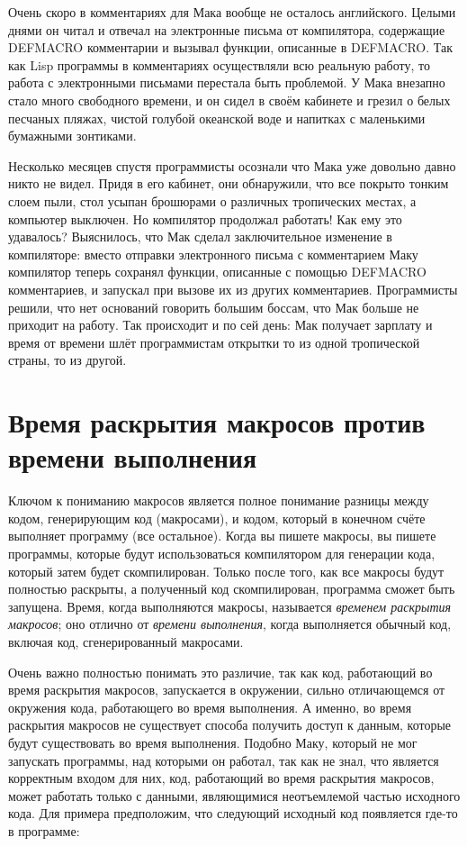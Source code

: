 Очень скоро в комментариях для Мака вообще не осталось английского. Целыми днями он читал
и отвечал на электронные письма от компилятора, содержащие DEFMACRO комментарии и вызывал
функции, описанные в DEFMACRO. Так как Lisp программы в комментариях осуществляли всю
реальную работу, то работа с электронными письмами перестала быть проблемой. У Мака
внезапно стало много свободного времени, и он сидел в своём кабинете и грезил о белых
песчаных пляжах, чистой голубой океанской воде и напитках с маленькими бумажными
зонтиками.

Несколько месяцев спустя программисты осознали что Мака уже довольно давно никто не
видел. Придя в его кабинет, они обнаружили, что все покрыто тонким слоем пыли, стол усыпан
брошюрами о различных тропических местах, а компьютер выключен. Но компилятор продолжал
работать! Как ему это удавалось? Выяснилось, что Мак сделал заключительное изменение в
компиляторе: вместо отправки электронного письма с комментарием Маку компилятор теперь
сохранял функции, описанные с помощью DEFMACRO комментариев, и запускал при вызове их из
других комментариев. Программисты решили, что нет оснований говорить большим боссам, что
Мак больше не приходит на работу. Так происходит и по сей день: Мак получает зарплату и
время от времени шлёт программистам открытки то из одной тропической страны, то из другой.

\section{Время раскрытия макросов против времени выполнения}

Ключом к пониманию макросов является полное понимание разницы между кодом, генерирующим
код (макросами), и кодом, который в конечном счёте выполняет программу (все
остальное). Когда вы пишете макросы, вы пишете программы, которые будут использоваться
компилятором для генерации кода, который затем будет скомпилирован. Только после того, как
все макросы будут полностью раскрыты, а полученный код скомпилирован, программа сможет
быть запущена. Время, когда выполняются макросы, называется \textit{временем раскрытия
  макросов}; оно отлично от \textit{времени выполнения}, когда выполняется обычный код,
включая код, сгенерированный макросами.

Очень важно полностью понимать это различие, так как код, работающий во время раскрытия
макросов, запускается в окружении, сильно отличающемся от окружения кода, работающего во
время выполнения. А именно, во время раскрытия макросов не существует способа получить
доступ к данным, которые будут существовать во время выполнения. Подобно Маку, который не
мог запускать программы, над которыми он работал, так как не знал, что является корректным
входом для них, код, работающий во время раскрытия макросов, может работать только с
данными, являющимися неотъемлемой частью исходного кода. Для примера предположим, что
следующий исходный код появляется где-то в программе:

